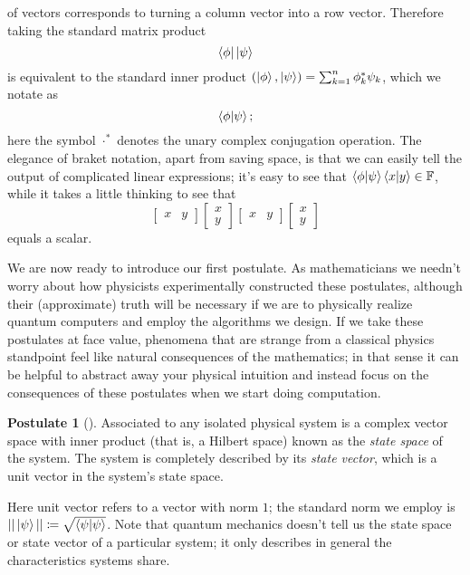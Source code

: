 \documentclass[12pt,twoside]{reedthesis}
\theoremstyle{plain}   %
\theoremstyle{definition}
\newtheorem{post}{Postulate}[section]
\theoremstyle{remark}
\numberwithin{equation}{section}
\begin{document}
  of vectors corresponds to turning a column vector into a row vector. Therefore taking the standard matrix product
  \[\bra{\phi} \ket{\psi}\]
  is equivalent to the standard inner product $(\ket{\phi}, \ket{\psi}) = \sum_{k=1}^n \phi_k^* \psi_k$, which we notate as
  \[\braket{\phi | \psi};\]
  here the symbol $\cdot^*$ denotes the unary complex conjugation operation.
  The elegance of braket notation, apart from saving space, is that we can easily tell the output of complicated linear expressions;
  it's easy to see that $\braket{\phi | \psi} \braket{x | y} \in \mathbb{F}$, while it takes a little thinking to see that
  \[
    \begin{bmatrix}
      x & y
    \end{bmatrix}
    \begin{bmatrix}
      x \\ y
    \end{bmatrix}
    \begin{bmatrix}
      x & y
    \end{bmatrix}
    \begin{bmatrix}
      x \\ y
    \end{bmatrix}
  \]
  equals a scalar.
  \par
  We are now ready to introduce our first postulate. As mathematicians we needn't worry about how physicists experimentally constructed these postulates, although their
  (approximate) truth will be necessary if we are to physically realize quantum computers and employ the algorithms we design.
  If we take these postulates at face value, phenomena that are strange from a classical physics standpoint feel like natural consequences of the mathematics;
  in that sense it can be helpful to abstract away your physical intuition and instead focus on the consequences of these postulates when we start doing computation.
  \begin{post}[{\cite[2.2.1]{nielsen2010}}]
    Associated to any isolated physical system is a complex vector space
    with inner product (that is, a Hilbert space) known as the \emph{state space} of the
    system. The system is completely described by its \emph{state vector}, which is a unit
    vector in the system's state space.
  \end{post}
  Here unit vector refers to a vector with norm $1$; the standard norm we employ is $|| \ket{\psi} || \coloneq \sqrt{\braket{\psi| \psi}}$.
  Note that quantum mechanics doesn't tell us the state space or state vector of a particular system; it only describes in general the characteristics systems share.
\end{document}
